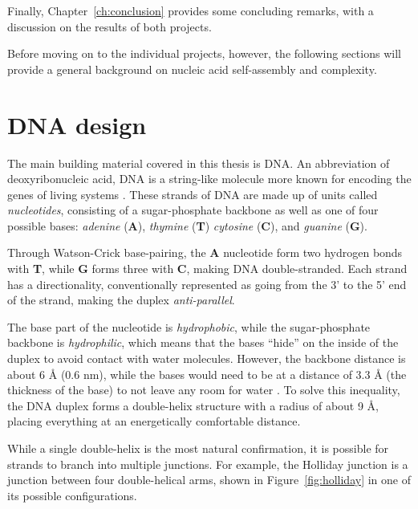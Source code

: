 Finally, Chapter~\ref{ch:conclusion} provides some concluding remarks, with a discussion on the results of both projects.

Before moving on to the individual projects, however, the following sections will provide a general background on nucleic acid self-assembly and complexity.



\section{DNA design}

The main building material covered in this thesis is DNA. An abbreviation of deoxyribonucleic acid, DNA is a string-like molecule more known for encoding the genes of living systems \cite{calladine1997understanding}. These strands of DNA are made up of units called \emph{nucleotides}, consisting of a sugar-phosphate backbone as well as one of four possible bases: \emph{adenine} (\textbf{A}), \emph{thymine} (\textbf{T}) \emph{cytosine} (\textbf{C}), and \emph{guanine} (\textbf{G}).

Through Watson-Crick base-pairing, the \textbf{A} nucleotide form two hydrogen bonds with \textbf{T}, while \textbf{G} forms three with \textbf{C}, making DNA double-stranded. Each strand has a directionality, conventionally represented as going from the 3' to the 5' end of the strand, making the duplex \emph{anti-parallel}.

The base part of the nucleotide is \emph{hydrophobic}, while the sugar-phosphate backbone is \emph{hydrophilic}, which means that the bases ``hide'' on the inside of the duplex to avoid contact with water molecules. However, the backbone distance is about 6 Å (0.6 nm), while the bases would need to be at a distance of 3.3 Å (the thickness of the base) to not leave any room for water \cite{calladine1997understanding}. To solve this inequality, the DNA duplex forms a double-helix structure with a radius of about 9 Å, placing everything at an energetically comfortable distance.

While a single double-helix is the most natural confirmation, it is possible for strands to branch into multiple junctions. For example, the Holliday junction is a junction between four double-helical arms, shown in Figure~\ref{fig:holliday} in one of its possible configurations.

